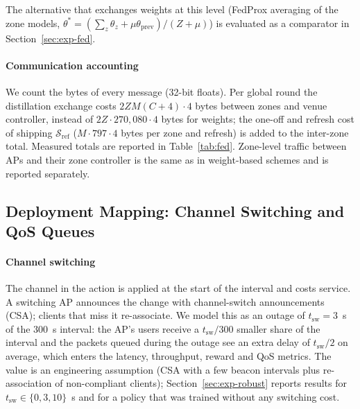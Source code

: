The alternative that exchanges weights at this level (FedProx averaging of the zone models, $\theta^{*}=(\sum_z\theta_z+\mu\theta_{\mathrm{prev}})/(Z+\mu)$) is evaluated as a comparator in Section~\ref{sec:exp-fed}.

\paragraph{Communication accounting} We count the bytes of every message (32-bit floats). Per global round the distillation exchange costs $2ZM(C{+}4)\cdot 4$ bytes between zones and venue controller, instead of $2Z\cdot270{,}080\cdot4$ bytes for weights; the one-off and refresh cost of shipping $\mathcal{S}_{\mathrm{ref}}$ ($M\cdot797\cdot4$ bytes per zone and refresh) is added to the inter-zone total. Measured totals are reported in Table~\ref{tab:fed}. Zone-level traffic between APs and their zone controller is the same as in weight-based schemes and is reported separately.

\subsection{Deployment Mapping: Channel Switching and QoS Queues}
\label{sec:deploy}

\paragraph{Channel switching} The channel in the action is applied at the start of the interval and costs service. A switching AP announces the change with channel-switch announcements (CSA); clients that miss it re-associate. We model this as an outage of $t_{\mathrm{sw}}=3$~s of the 300~s interval: the AP's users receive a $t_{\mathrm{sw}}/300$ smaller share of the interval and the packets queued during the outage see an extra delay of $t_{\mathrm{sw}}/2$ on average, which enters the latency, throughput, reward and QoS metrics. The value is an engineering assumption (CSA with a few beacon intervals plus re-association of non-compliant clients); Section~\ref{sec:exp-robust} reports results for $t_{\mathrm{sw}}\in\{0,3,10\}$~s and for a policy that was trained without any switching cost.


